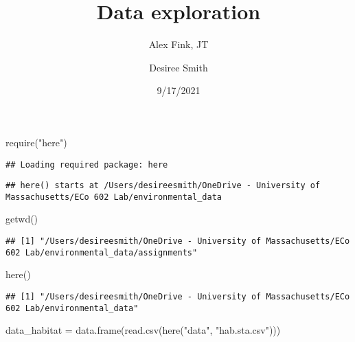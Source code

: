 \documentclass[
]{article}
\title{Data exploration}
\subtitle{Alex Fink, JT}
\author{Desiree Smith}
\date{9/17/2021}
\newenvironment{Shaded}{\begin{snugshade}}{\end{snugshade}}
\newcommand{\FunctionTok}[1]{\textcolor[rgb]{0.00,0.00,0.00}{#1}}
\newcommand{\NormalTok}[1]{#1}
\newcommand{\OtherTok}[1]{\textcolor[rgb]{0.56,0.35,0.01}{#1}}
\newcommand{\StringTok}[1]{\textcolor[rgb]{0.31,0.60,0.02}{#1}}
\begin{document}
\maketitle

\begin{Shaded}
\begin{Highlighting}[]
\FunctionTok{require}\NormalTok{(}\StringTok{"here"}\NormalTok{)}
\end{Highlighting}
\end{Shaded}

\begin{verbatim}
## Loading required package: here
\end{verbatim}

\begin{verbatim}
## here() starts at /Users/desireesmith/OneDrive - University of Massachusetts/ECo 602 Lab/environmental_data
\end{verbatim}

\begin{Shaded}
\begin{Highlighting}[]
\FunctionTok{getwd}\NormalTok{()}
\end{Highlighting}
\end{Shaded}

\begin{verbatim}
## [1] "/Users/desireesmith/OneDrive - University of Massachusetts/ECo 602 Lab/environmental_data/assignments"
\end{verbatim}

\begin{Shaded}
\begin{Highlighting}[]
\FunctionTok{here}\NormalTok{()}
\end{Highlighting}
\end{Shaded}

\begin{verbatim}
## [1] "/Users/desireesmith/OneDrive - University of Massachusetts/ECo 602 Lab/environmental_data"
\end{verbatim}

\begin{Shaded}
\begin{Highlighting}[]
\NormalTok{data\_habitat }\OtherTok{=} \FunctionTok{data.frame}\NormalTok{(}\FunctionTok{read.csv}\NormalTok{(}\FunctionTok{here}\NormalTok{(}\StringTok{"data"}\NormalTok{, }\StringTok{"hab.sta.csv"}\NormalTok{)))}
\end{Highlighting}
\end{Shaded}
\end{document}
